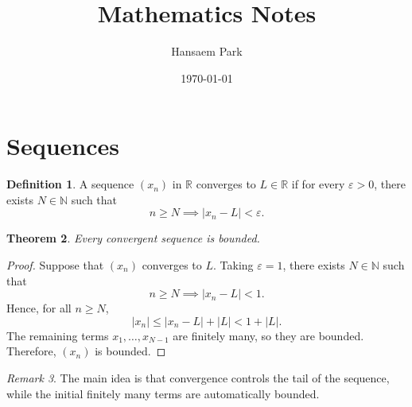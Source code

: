 \documentclass[11pt]{article}
\title{Mathematics Notes}
\author{Hansaem Park}
\date{\today}
\theoremstyle{definition}
\newtheorem{definition}{Definition}[section]
\theoremstyle{plain}
\newtheorem{theorem}[definition]{Theorem}
\theoremstyle{remark}
\newtheorem{remark}[definition]{Remark}
\numberwithin{equation}{section}
\newcommand{\N}{\mathbb{N}}
\newcommand{\R}{\mathbb{R}}
\begin{document}
\maketitle
\tableofcontents

\section{Sequences}

\begin{definition}
A sequence $(x_n)$ in $\R$ converges to $L \in \R$ if for every $\varepsilon > 0$,
there exists $N \in \N$ such that
\[
    n \geq N \implies |x_n - L| < \varepsilon.
\]
\end{definition}

\begin{theorem}
Every convergent sequence is bounded.
\end{theorem}

\begin{proof}
Suppose that $(x_n)$ converges to $L$. Taking $\varepsilon = 1$, there exists
$N \in \N$ such that
\[
    n \geq N \implies |x_n - L| < 1.
\]
Hence, for all $n \geq N$,
\[
    |x_n| \leq |x_n - L| + |L| < 1 + |L|.
\]
The remaining terms $x_1, \dots, x_{N-1}$ are finitely many, so they are bounded.
Therefore, $(x_n)$ is bounded.
\end{proof}

\begin{remark}
The main idea is that convergence controls the tail of the sequence, while the
initial finitely many terms are automatically bounded.
\end{remark}
\end{document}
